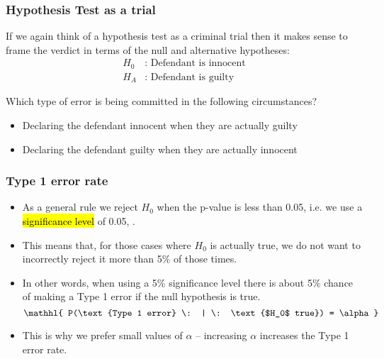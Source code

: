 
\begin{frame}[shrink]
\frametitle{Hypothesis Test as a trial}

If we again think of a hypothesis test as a criminal trial then it makes sense to frame the verdict in terms of the null and alternative hypotheses:
\begin{align*}
H_0&:\text{ Defendant is innocent} \\
H_A&:\text{ Defendant is guilty}
\end{align*}

Which type of error is being committed in the following circumstances?

\begin{itemize}
\item Declaring the defendant innocent when they are actually guilty
\item Declaring the defendant guilty when they are actually innocent
\end{itemize}

\end{frame}


\begin{frame}
\frametitle{Type 1 error rate}

\begin{itemize}

\item As a general rule we reject $H_0$ when the p-value is less than 0.05, i.e. we use a \hl{significance level} of 0.05, .

\pause

\item This means that, for those cases where $H_0$ is actually true, we do not want to incorrectly reject it more than 5\% of those times. 

\pause

\item In other words, when using a 5\% significance level there is about 5\% chance of making a Type 1 error if the null hypothesis is true.
\[ \mathhl{ P(\text{Type 1 error} \: | \: \text{$H_0$ true}) = \alpha } \]

\pause

\item This is why we prefer small values of $\alpha$ -- increasing $\alpha$ increases the Type 1 error rate.

\end{itemize}

\end{frame}

